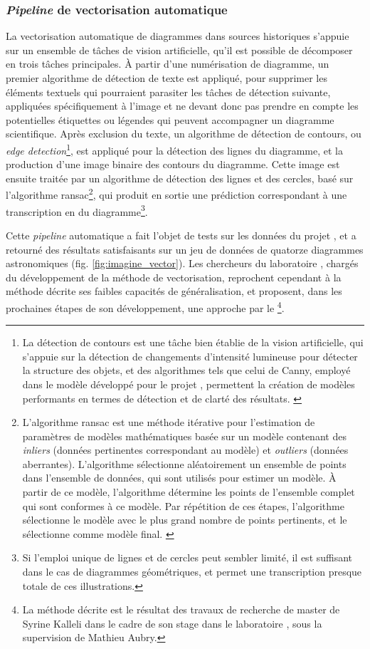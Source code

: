 	\subsubsection{\textit{Pipeline} de vectorisation automatique}
	La vectorisation automatique de diagrammes dans sources historiques s'appuie sur un ensemble de tâches de vision artificielle, qu'il est possible de décomposer en trois tâches principales. À partir d'une numérisation de diagramme, un premier algorithme de détection de texte est appliqué, pour supprimer les éléments textuels qui pourraient parasiter les tâches de détection suivante, appliquées spécifiquement à l'image et ne devant donc pas prendre en compte les potentielles étiquettes ou légendes qui peuvent accompagner un diagramme scientifique. Après exclusion du texte, un algorithme de détection de contours, ou \textit{edge detection}\footnote{La détection de contours est une tâche bien établie de la vision artificielle, qui s'appuie sur la détection de changements d'intensité lumineuse pour détecter la structure des objets, et des algorithmes tels que celui de Canny, employé dans le modèle développé pour le projet \eida, permettent la création de modèles performants en termes de détection et de clarté des résultats. \cite{cannyComputationalApproachEdge1986}}, est appliqué pour la détection des lignes du diagramme, et la production d'une image binaire des contours du diagramme. Cette image est ensuite traitée par un algorithme de détection des lignes et des cercles, basé sur l'algorithme \acrfull{ransac}\footnote{L'algorithme \acrshort{ransac} est une méthode itérative pour l'estimation de paramètres de modèles mathématiques basée sur un modèle contenant des \textit{inliers} (données pertinentes correspondant au modèle) et \textit{outliers} (données aberrantes). L'algorithme sélectionne aléatoirement un ensemble de points dans l'ensemble de données, qui sont utilisés pour estimer un modèle. À partir de ce modèle, l'algorithme détermine les points de l'ensemble complet qui sont conformes à ce modèle. Par répétition de ces étapes, l'algorithme sélectionne le modèle avec le plus grand nombre de points pertinents, et le sélectionne comme modèle final. \cite{derpanisOverviewRANSACAlgorithm2010a}}, qui produit en sortie une prédiction correspondant à une transcription en \svg du diagramme\footnote{Si l'emploi unique de lignes et de cercles peut sembler limité, il est suffisant dans le cas de diagrammes géométriques, et permet une transcription presque totale de ces illustrations.}. 
	
	Cette \textit{pipeline} automatique a fait l'objet de tests sur les données du projet \eida, et a retourné des résultats satisfaisants sur un jeu de données de quatorze diagrammes astronomiques (fig. \ref{fig:imagine_vector}). Les chercheurs du laboratoire \imagine, chargés du développement de la méthode de vectorisation, reprochent cependant à la méthode décrite ses faibles capacités de généralisation, et proposent, dans les prochaines étapes de son développement, une approche par le \dl\footnote{La méthode décrite est le résultat des travaux de recherche de master de Syrine Kalleli dans le cadre de son stage dans le laboratoire \imagine, sous la supervision de Mathieu Aubry.}.
	
